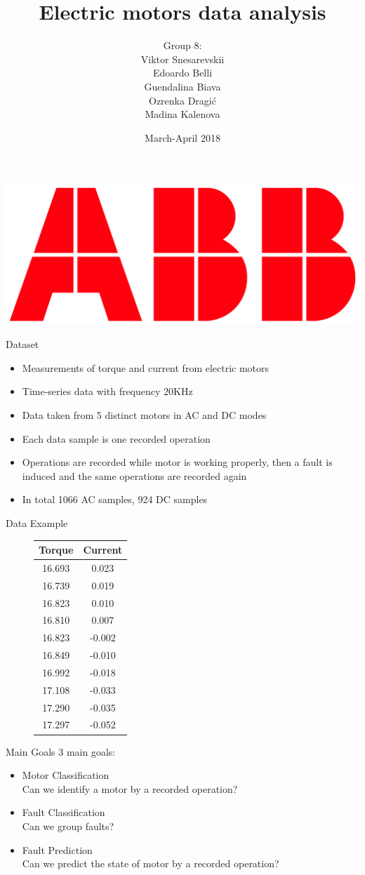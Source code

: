 \documentclass[9pt]{beamer}
\title[Electric motors data analysis]{\huge Electric motors data analysis}
\author[Snesarevskii, Belli, Biava, Dragi\'c, Kalenova] {{\Large Group 8:\\}Viktor Snesarevskii\\Edoardo Belli\\Guendalina Biava\\Ozrenka Dragi\'c\\Madina Kalenova}
\date{March-April 2018}
\begin{document}
	\begin{frame}
	\titlepage
	\vfill
	\begin{flushright}
		\includegraphics[height=.7cm]{abb.png}
	\end{flushright}
\end{frame}
\begin{frame}{Dataset}
\begin{itemize} %
\item Measurements of torque and current from electric motors
\item Time-series data with frequency 20KHz
\item Data taken from 5 distinct motors in AC and DC modes
\item Each data sample is one recorded operation
\item Operations are recorded while motor is working properly, then a fault is induced and the same operations are recorded again 
\item In total 1066 AC samples, 924 DC samples
\end{itemize}
\end{frame}
\begin{frame}{Data Example}
\begin{figure}\centering
\begin{tabular}{|c|c|}\hline
\textbf{Torque} & \textbf{Current} \\\hline
16.693&0.023\\\hline
16.739&0.019\\\hline
16.823&0.010\\\hline
16.810&0.007\\\hline
16.823&-0.002\\\hline
16.849&-0.010\\\hline
16.992&-0.018\\\hline
17.108&-0.033\\\hline
17.290&-0.035\\\hline
17.297&-0.052\\\hline
\end{tabular}\end{figure}
\end{frame}
\begin{frame}{Main Goals}
3 main goals:
\begin{itemize} %
\item {\large Motor Classification}\\
Can we identify a motor by a recorded operation?
\item {\large Fault Classification}\\
Can we group faults?
\item {\large Fault Prediction}\\
Can we predict the state of motor by a recorded operation?
\end{itemize}
\end{frame}
\end{document}
